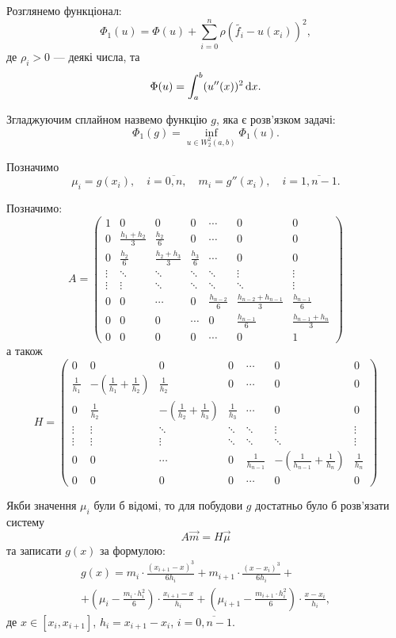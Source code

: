 Розглянемо функціонал: \[ \Phi_1(u) = \Phi(u) + \sum_{i = 0}^n \rho \left( \tilde{f_i} - u(x_i) \right)^2,\] де $\rho_i > 0$ --- деякі числа, та \[\Phi(u) = \int_a^b (u''(x))^2 \mathop{}\!\mathrm{d} x.\]

Згладжуючим сплайном назвемо функцію $g$, яка є розв'язком задачі: \[ \Phi_1(g) = \inf_{u \in W_2^2(a, b)} \Phi_1(u).\]

Позначимо \[ \mu_i = g(x_i), \quad i = \overline{0, n}, \quad m_i = g''(x_i), \quad i = \overline{1, n - 1}.\]

Позначимо: \[ A = \begin{pmatrix}
    1 & 0 & 0 & 0 & \cdots & 0 & 0 \\
    0 & \frac{h_1 + h_2}{3} & \frac{h_2}{6} & 0 & \cdots & 0 & 0 \\
    0 & \frac{h_2}{6} & \frac{h_2 + h_3}{3} & \frac{h_3}{6} & \cdots & 0 & 0 \\
    \vdots & \ddots & \ddots & \ddots & \ddots & \vdots & \vdots \\
    \vdots & \vdots & \ddots & \ddots & \ddots & \ddots & \vdots \\
    0 & 0 & \cdots & 0 & \frac{h_{n - 2}}{6} & \frac{h_{n - 2} + h_{n - 1}}{3} & \frac{h_{n - 1}}{6} \\
    0 & 0 & 0 & \cdots & 0 & \frac{h_{n - 1}}{6} & \frac{h_{n - 1} + h_n}{3} \\
    0 & 0 & 0 & 0 & \cdots & 0 & 1
\end{pmatrix} \]
а також
\[ H = \begin{pmatrix}
    0 & 0 & 0 & 0 & \cdots & 0 & 0 \\
    \frac{1}{h_1} & - \left( \frac{1}{h_1} + \frac{1}{h_2} \right) & \frac{1}{h_2} & 0 & \cdots & 0 & 0 \\
    0 & \frac{1}{h_2} & - \left( \frac{1}{h_2} + \frac{1}{h_3} \right) & \frac{1}{h_3} & \cdots & 0 & 0 \\
    \vdots & \vdots & \ddots & \ddots & \ddots & \vdots & \vdots \\
    \vdots & \vdots & \vdots & \ddots & \ddots & \ddots & \vdots \\
    0 & 0 & \cdots & 0 & \frac{1}{h_{n - 1}} & - \left( \frac{1}{h_{n - 1}} + \frac{1}{h_n} \right) & \frac{1}{h_n} \\
    0 & 0 & 0 & 0 & \cdots & 0 & 0
\end{pmatrix} \]

Якби значення $\mu_i$ були б відомі, то для побудови $g$ достатньо було б розв'язати систему \begin{equation} \label{amhmu} A \vec m = H \vec \mu \end{equation} та записати $g(x)$ за формулою:
\begin{multline} 
    \label{eq}
    g(x) = m_i \cdot \frac{(x_{i + 1} - x)^3}{6 h_i} + m_{i + 1} \cdot \frac{(x - x_i)^3}{6 h_i} + \\
    + \left( \mu_i - \frac{m_i \cdot h_i^2}{6} \right) \cdot \frac{x_{i + 1} - x}{h_i} + \left( \mu_{i + 1} - \frac{m_{i + 1} \cdot h_i^2}{6}\right) \cdot \frac{x - x_i}{h_i}, 
\end{multline}
де $x \in [x_i, x_{i + 1}]$, $h_i = x_{i + 1} - x_i$, $i = \overline{0, n - 1}$. \medskip

